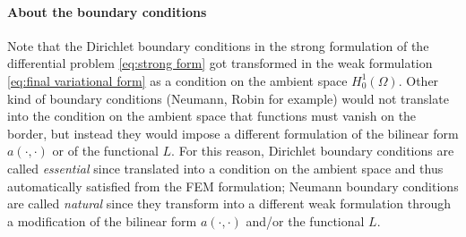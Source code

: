 \paragraph{About the boundary conditions}
	Note that the Dirichlet boundary conditions in the strong formulation of the differential problem \ref{eq:strong form} got transformed in the weak formulation \ref{eq:final variational form} as a condition on the ambient space $H_0^1(\Omega)$. Other kind of boundary conditions (Neumann, Robin for example) would not translate into the condition on the ambient space that functions must vanish on the border, but instead they would impose a different formulation of the bilinear form $a(\cdot, \cdot)$ or of the functional $L$. For this reason, Dirichlet boundary conditions are called \textit{essential} since translated into a condition on the ambient space and thus automatically satisfied from the FEM formulation; Neumann boundary conditions are called \textit{natural} since they transform into a different weak formulation through a modification of the bilinear form $a(\cdot, \cdot)$ and/or the functional $L$.



